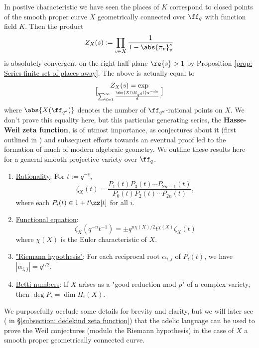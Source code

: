 \documentclass[11pt, x11names, openany]{book}
\begin{document}
\begin{example}
    \label{example: Hasse-Weil zeta func}
In postive characteristic we have seen the places of $K$ correspond to closed points of the smooth proper curve $X$ geometrically connected over $\ff_q$ with function field $K$. Then the product
\begin{equation*}
    Z_X(s) := \prod_{v \in X} \frac{1}{1 - \abs{\pi_v}_v^{s}}
\end{equation*}
is absolutely convergent on the right half plane $\re{s} > 1$ by Proposition \ref{prop: Series finite set of places away}. The above is actually equal to
\begin{equation*}
    Z_X(s) = \exp \brack{\sum_{d=1}^\infty \frac{\abs{X(\ff_{q^d})} q^{-ds}}{d}},
\end{equation*}
where $\abs{X(\ff_{q^d})}$ denotes the number of $\ff_{q^d}$-rational points on $X$. We don't prove this equality here, but this particular generating series, the \textbf{Hasse-Weil zeta function}, is of utmost importance, as conjectures about it (first outlined in \cite{WeilOG_Paper}) and subsequent efforts towards an eventual proof led to the formation of much of modern algebraic geometry. We outline these results here for a general smooth projective variety over $\ff_q$.
\begin{enumerate}
    \item \underline{Rationality}: 
    For $t := q^{-s}$, 
    \begin{equation*}
        \zeta_X(t) = \frac{P_1(t) P_3(t) \cdots P_{2n-1}(t)}{P_0(t) P_2(t) \cdots P_{2n}(t)},
    \end{equation*}
    where each $P_i(t) \in 1 + t \zz[t]$ for all $i$.
    \item \underline{Functional equation}:
    \[ \zeta_X(q^{-n}t^{-1}) = \pm q^{n\chi(X)/2}t^{\chi(X)} \zeta_X(t)\] 
    where $\chi(X)$ is the Euler characteristic of $X$.
    \item \underline{"Riemann hypothesis"}: For each reciprocal root $\alpha_{i, j}$ of $P_i(t)$, we have $|\alpha_{i, j}| = q^{i/2}$.
    \item \underline{Betti numbers}: If $X$ arises as a "good reduction mod $p$" of a complex variety, then $\deg P_i = \dim H_i(X)$.
\end{enumerate}
We purposefully occlude some details for brevity and clarity, but we will later see ( in \S \ref{subsection: dedekind zeta function}) that the adelic language can be used to prove the Weil conjectures (modulo the Riemann hypothesis) in the case of $X$ a smooth proper geometrically connected curve.
\end{example}
\end{document}
